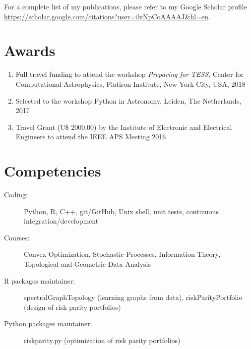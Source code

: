 \documentclass[10pt]{article}
\begin{document}
\begin{titlepage}
For a complete list of my publications, please refer to my Google Scholar profile \url{https://scholar.google.com/citations?user=ilvNpCoAAAAJ&hl=en}.

\section*{Awards}
\begin{enumerate}
  \item Full travel funding to attend the workshop \textit{Preparing for TESS}, Center for Computational Astrophysics, Flatiron Institute, New York City, USA, 2018
  \item Selected to the workshop \textsf{Python} in Astronomy, Leiden, The Netherlands, 2017
  \item Travel Grant (U\$ 2000,00) by the Institute of Electronic and Electrical Engineers to attend the IEEE APS Meeting 2016
\end{enumerate}


\section*{Competencies}
\begin{description}
  \item[Coding:] \textsf{Python}, \textsf{R}, \textsf{C++}, git/GitHub, Unix shell, unit tests, continuous integration/development
    \item[Courses:] Convex Optimization, Stochastic Processes, Information Theory, Topological and Geometric Data Analysis
    \item[\textsf{R} packages maintainer:] \textsf{spectralGraphTopology} (learning graphs from data), \textsf{riskParityPortfolio} (design of risk parity portfolios)
    \item[\textsf{Python} packages maintainer:] \textsf{riskparity.py} (optimization of risk parity portfolios)
\end{description}

\end{titlepage}
\end{document}

